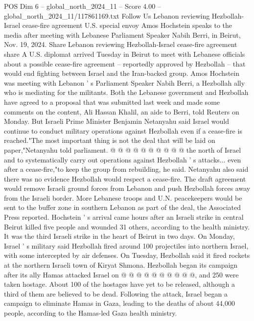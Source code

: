 \begin{textsample}{POS Dim 6 – global\_north\_2024\_11 – Score 4.00 – global\_north\_2024\_11/117861169.txt}  \label{ex:f6_pos_355}
Follow Us Lebanon reviewing Hezbollah-Israel cease-fire agreement U.S. special envoy Amos Hochstein speaks to the media after meeting with Lebanese Parliament Speaker Nabih Berri, in Beirut, Nov. 19, 2024.
Share Lebanon reviewing Hezbollah-Israel cease-fire agreement share A U.S. diplomat arrived Tuesday in Beirut to meet with Lebanese officials about a possible cease-fire agreement -- reportedly approved by Hezbollah -- that would end fighting between Israel and the Iran-backed group.
Amos Hochstein was meeting with Lebanon ' s Parliament Speaker Nabih Berri, a Hezbollah ally who is mediating for the militants.
Both the Lebanese government and Hezbollah have agreed to a proposal that was submitted last week and made some comments on the content, Ali Hassan Khalil, an aide to Berri, told Reuters on Monday.
But Israeli Prime Minister Benjamin Netanyahu said Israel would continue to conduct military operations against Hezbollah even if a cease-fire is reached."The most important thing is not the deal that will be laid on paper,"Netanyahu told parliament. @ @ @ @ @ @ @ @ @ @ the north of Israel and to systematically carry out operations against Hezbollah ' s attacks... even after a cease-fire,"to keep the group from rebuilding, he said.
Netanyahu also said there was no evidence Hezbollah would respect a cease-fire.
The draft agreement would remove Israeli ground forces from Lebanon and push Hezbollah forces away from the Israeli border.
More Lebanese troops and U.N. peacekeepers would be sent to the buffer zone in southern Lebanon as part of the deal, the Associated Press reported.
Hochstein ' s arrival came hours after an Israeli strike in central Beirut killed five people and wounded 31 others, according to the health ministry.
It was the third Israeli strike in the heart of Beirut in two days.
On Monday, Israel ' s military said Hezbollah fired around 100 projectiles into northern Israel, with some intercepted by air defenses.
On Tuesday, Hezbollah said it fired rockets at the northern Israeli town of Kiryat Shmona.
Hezbollah began its campaign after its ally Hamas attacked Israel on @ @ @ @ @ @ @ @ @ @, and 250 were taken hostage.
About 100 of the hostages have yet to be released, although a third of them are believed to be dead.
Following the attack, Israel began a campaign to eliminate Hamas in Gaza, leading to the deaths of about 44,000 people, according to the Hamas-led Gaza health ministry.

\end{textsample}
